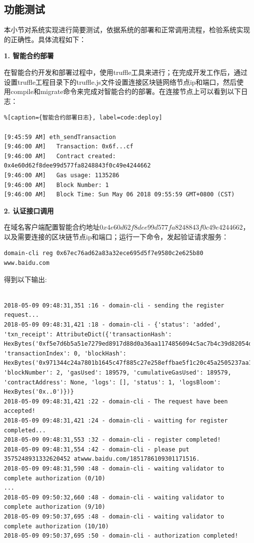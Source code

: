 \subsection{功能测试}

本小节对系统实现进行简要测试，依据系统的部署和正常调用流程，检验系统实现的正确性。具体流程如下：


\noindent\textbf{1. 智能合约部署}

在智能合约开发和部署过程中，使用truffle工具来进行；在完成开发工作后，通过设置truffle工程目录下的truffle.js文件设置连接区块链网络节点ip和端口，然后使用compile和migrate命令来完成对智能合约的部署。在连接节点上可以看到以下日志：

\begin{lstlisting}%[caption={智能合约部署日志}, label=code:deploy]

[9:45:59 AM] eth_sendTransaction
[9:46:00 AM]   Transaction: 0x6f...cf
[9:46:00 AM]   Contract created: 0x4e60d62f8dee99d577fa8248843f0c49e4244662
[9:46:00 AM]   Gas usage: 1135286
[9:46:00 AM]   Block Number: 1
[9:46:00 AM]   Block Time: Sun May 06 2018 09:55:59 GMT+0800 (CST)

\end{lstlisting}

\noindent\textbf{2. 认证接口调用}

在域名客户端配置智能合约地址$0x4e60d62f8dee99d577fa8248843f0c49e4244662$，以及需要连接的区块链节点ip和端口；运行一下命令，发起验证请求服务：

\begin{lstlisting}
domain-cli reg 0x67ec76ad62a83a32ece695d5f7e9580c2e625b80 www.baidu.com
\end{lstlisting}

得到以下输出:

\begin{lstlisting}

2018-05-09 09:48:31,351 :16 - domain-cli - sending the register request...
2018-05-09 09:48:31,421 :18 - domain-cli - {'status': 'added', 'txn_receipt': AttributeDict({'transactionHash': HexBytes('0xf5e7d6b5a51e7279ed8917d88d0a36aa1174856094c5ac7b4c39d82054d05816'), 'transactionIndex': 0, 'blockHash': HexBytes('0x971344c24a7801b1645c47f885c27e258effbae5f1c20c45a2505237aa13dce2'), 'blockNumber': 2, 'gasUsed': 189579, 'cumulativeGasUsed': 189579, 'contractAddress': None, 'logs': [], 'status': 1, 'logsBloom': HexBytes('0x..0')})}
2018-05-09 09:48:31,421 :22 - domain-cli - The request have been accepted!
2018-05-09 09:48:31,421 :24 - domain-cli - waitting for register completed...
2018-05-09 09:48:31,553 :32 - domain-cli - register completed!
2018-05-09 09:48:31,554 :42 - domain-cli - please put 3575248931332620452 atwww.baidu.com/1851786109301171516.
2018-05-09 09:48:31,590 :48 - domain-cli - waiting validator to complete authorization (0/10)
...
2018-05-09 09:50:32,660 :48 - domain-cli - waiting validator to complete authorization (9/10)
2018-05-09 09:50:37,695 :48 - domain-cli - waiting validator to complete authorization (10/10)
2018-05-09 09:50:37,695 :50 - domain-cli - authorization completed!
 \end{lstlisting}

